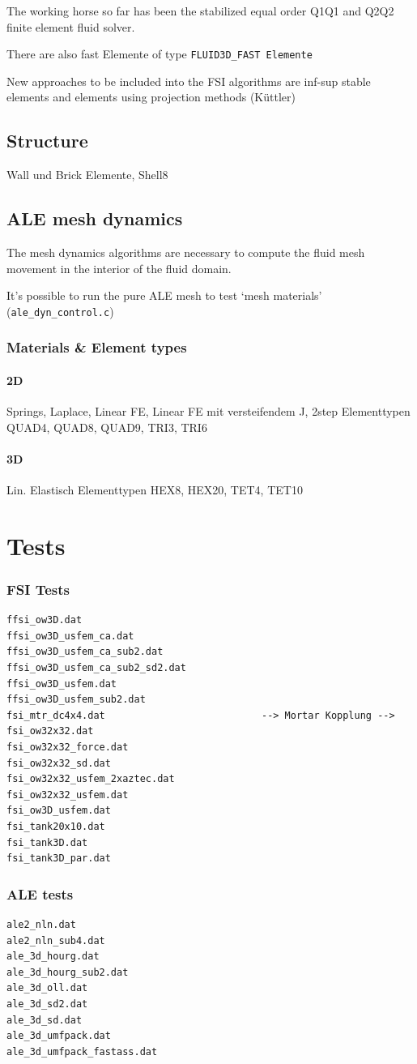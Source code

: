 The working horse so far has been the stabilized equal order Q1Q1 and Q2Q2 finite element fluid solver.

There are also fast Elemente of type \verb|FLUID3D_FAST Elemente|

New approaches to be included into the FSI algorithms are inf-sup stable elements and elements using projection methods (K\"uttler)

\subsection{Structure}


Wall und Brick Elemente, Shell8


\subsection{ALE mesh dynamics}

The mesh dynamics algorithms are necessary to compute the fluid mesh movement in the interior of the fluid domain.

It's possible to run the pure ALE mesh to test `mesh materials' (\verb|ale_dyn_control.c|)

\subsubsection{Materials \& Element types}
\paragraph{2D}

Springs, Laplace, Linear FE, Linear FE mit versteifendem J, 2step
Elementtypen
QUAD4, QUAD8, QUAD9, TRI3, TRI6

\paragraph{3D}

Lin. Elastisch
Elementtypen
HEX8, HEX20, TET4, TET10


\section{Tests}
\subsubsection{FSI Tests}
\begin{verbatim}
ffsi_ow3D.dat
ffsi_ow3D_usfem_ca.dat
ffsi_ow3D_usfem_ca_sub2.dat
ffsi_ow3D_usfem_ca_sub2_sd2.dat
ffsi_ow3D_usfem.dat
ffsi_ow3D_usfem_sub2.dat
fsi_mtr_dc4x4.dat                           --> Mortar Kopplung -->
fsi_ow32x32.dat
fsi_ow32x32_force.dat
fsi_ow32x32_sd.dat
fsi_ow32x32_usfem_2xaztec.dat
fsi_ow32x32_usfem.dat
fsi_ow3D_usfem.dat
fsi_tank20x10.dat
fsi_tank3D.dat
fsi_tank3D_par.dat
\end{verbatim}

\subsubsection{ALE tests}

\begin{verbatim}
ale2_nln.dat
ale2_nln_sub4.dat
ale_3d_hourg.dat
ale_3d_hourg_sub2.dat
ale_3d_oll.dat
ale_3d_sd2.dat
ale_3d_sd.dat
ale_3d_umfpack.dat
ale_3d_umfpack_fastass.dat
\end{verbatim}

